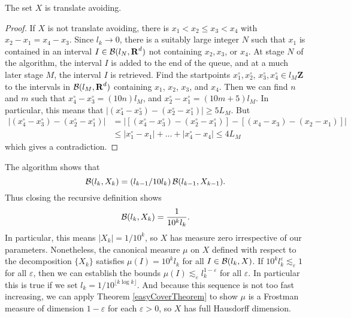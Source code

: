 \begin{lemma}
    The set $X$ is translate avoiding.
\end{lemma}
\begin{proof}
    If $X$ is not translate avoiding, there is $x_1 < x_2 \leq x_3 < x_4$ with $x_2 - x_1 = x_4 - x_3$. Since $l_k \to 0$, there is a suitably large integer $N$ such that $x_1$ is contained in an interval $I \in \mathcal{B}(l_N,\operatorname{\mathbf{R}}^d)$ not containing $x_2,x_3$, or $x_4$. At stage $N$ of the algorithm, the interval $I$ is added to the end of the queue, and at a much later stage $M$, the interval $I$ is retrieved. Find the startpoints $x_1^\circ, x_2^\circ$, $x_3^\circ, x_4^\circ \in l_M \mathbf{Z}$ to the intervals in $\mathcal{B}(l_M,\operatorname{\mathbf{R}}^d)$ containing $x_1$, $x_2$, $x_3$, and $x_4$. Then we can find $n$ and $m$ such that $x_4^\circ - x_3^\circ = (10n)l_M$, and $x_2^\circ - x_1^\circ = (10m + 5)l_M$. In particular, this means that $|(x_4^\circ - x_3^\circ) - (x_2^\circ - x_1^\circ)| \geq 5L_M$. But
    \begin{align*}
        |(x_4^\circ - x_3^\circ) - (x_2^\circ - x_1^\circ)| &= |[(x_4^\circ - x_3^\circ) - (x_2^\circ - x_1^\circ)] - [(x_4 - x_3) - (x_2 - x_1)]|\\
        &\leq |x_1^\circ - x_1| + \dots + |x_4^\circ - x_4| \leq 4 L_M
    \end{align*}
    which gives a contradiction.
\end{proof}

The algorithm shows that
%
\[ \operatorname{\mathcal{B}}(l_k,X_k) = (l_{k-1}/10l_k) \operatorname{\mathcal{B}}(l_{k-1},X_{k-1}). \]
%
Thus closing the recursive definition shows
%
\[ \operatorname{\mathcal{B}}(l_k,X_k) = \frac{1}{10^k l_k}. \]
%
In particular, this means $|X_k| = 1/10^k$, so $X$ has measure zero irrespective of our parameters. Nonetheless, the canonical measure $\mu$ on $X$ defined with respect to the decomposition $\{ X_k \}$ satisfies $\mu(I) = 10^k l_k$ for all $I \in \operatorname{\mathcal{B}}(l_k,X)$. If $10^k l_k^\varepsilon \lesssim_\varepsilon 1$ for all $\varepsilon$, then we can establish the bounds $\mu(I) \lesssim_\varepsilon l_k^{1-\varepsilon}$ for all $\varepsilon$. In particular this is true if we set $l_k = 1/10^{\lfloor k \log k \rfloor}$. And because this sequence is not too fast increasing, we can apply Theorem \ref{easyCoverTheorem} to show $\mu$ is a Frostman measure of dimension $1-\varepsilon$ for each $\varepsilon > 0$, so $X$ has full Hausdorff dimension.







